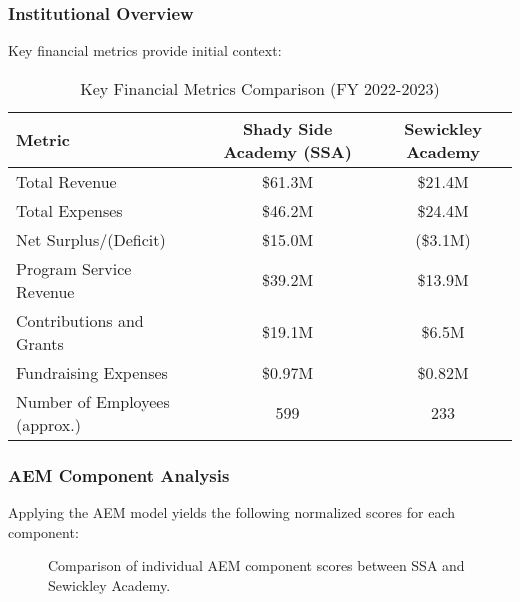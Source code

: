 \documentclass[12pt]{article}
\begin{document}
\subsubsection{Institutional Overview}
Key financial metrics provide initial context:
\begin{table}[H]
\centering
\caption{Key Financial Metrics Comparison (FY 2022-2023)} %
\label{tab:school_comparison_detail} %
\begin{tabular}{@{}lcc@{}}
\toprule
\textbf{Metric} & \textbf{Shady Side Academy (SSA)} & \textbf{Sewickley Academy} \\
\midrule
Total Revenue & \$61.3M & \$21.4M \\
Total Expenses & \$46.2M & \$24.4M \\
Net Surplus/(Deficit) & \$15.0M & (\$3.1M) \\ %
Program Service Revenue & \$39.2M & \$13.9M \\
Contributions and Grants & \$19.1M & \$6.5M \\
Fundraising Expenses & \$0.97M & \$0.82M \\
Number of Employees (approx.) & 599 & 233 \\ %
\bottomrule
\end{tabular}
\end{table}

\subsubsection{AEM Component Analysis}
Applying the AEM model yields the following normalized scores for each component:

\begin{figure}[H]
\centering
{}
\caption{Comparison of individual AEM component scores between SSA and Sewickley Academy.}
\label{fig:component_comparison_detail}
\end{figure}
\end{document}
